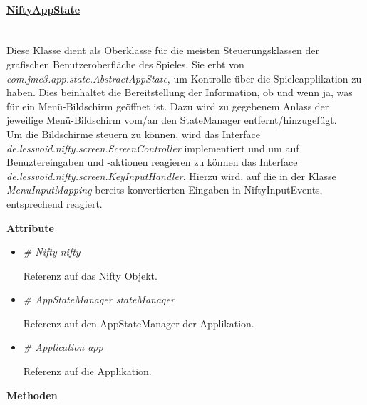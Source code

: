         \paragraph{\underline{NiftyAppState}}\label{nas} \mbox{}\\
            Diese Klasse dient als Oberklasse für die meisten Steuerungsklassen 
            der grafischen Benutzeroberfläche des Spieles. Sie erbt von 
            \textit{com.jme3.app.state.AbstractAppState}, um Kontrolle über die 
            Spieleapplikation zu haben. Dies beinhaltet  die Bereitstellung der
            Information, ob und wenn ja, was für ein Menü-Bildschirm geöffnet ist. 
            Dazu wird zu gegebenem Anlass der jeweilige Menü-Bildschirm vom/an den
            StateManager entfernt/hinzugefügt.\\
            Um die Bildschirme steuern zu können, wird das Interface
            \textit{de.lessvoid.nifty.screen.ScreenController} implementiert und um auf
            Benuztereingaben und -aktionen reagieren zu können das Interface
            \textit{de.lessvoid.nifty.screen.KeyInputHandler}. Hierzu wird,
            auf die in der Klasse \textit{MenuInputMapping} bereits konvertierten
            Eingaben in NiftyInputEvents, entsprechend reagiert.\\ \par
            \textbf{Attribute}
            \begin{itemize}
                \item  \textit{\# Nifty nifty}
                    \begin{leftbar}[0.9\linewidth]
                        Referenz auf das Nifty Objekt.
                    \end{leftbar}
                \item  \textit{\# AppStateManager stateManager}  
                    \begin{leftbar}[0.9\linewidth]
                        Referenz auf den AppStateManager der Applikation.
                    \end{leftbar}
                \item  \textit{\# Application app} 
                    \begin{leftbar}[0.9\linewidth]
                        Referenz auf die Applikation.
                    \end{leftbar}
            \end{itemize}
            \textbf{Methoden}					
